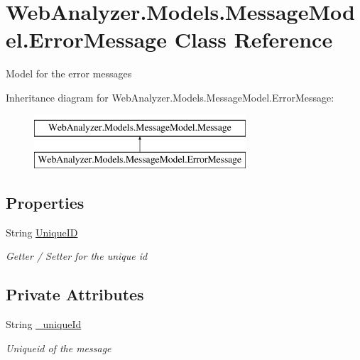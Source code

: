 \hypertarget{class_web_analyzer_1_1_models_1_1_message_model_1_1_error_message}{}\section{Web\+Analyzer.\+Models.\+Message\+Model.\+Error\+Message Class Reference}
\label{class_web_analyzer_1_1_models_1_1_message_model_1_1_error_message}


Model for the error messages  


Inheritance diagram for Web\+Analyzer.\+Models.\+Message\+Model.\+Error\+Message\+:\begin{figure}[H]
\begin{center}
\leavevmode
\includegraphics[height=2.000000cm]{class_web_analyzer_1_1_models_1_1_message_model_1_1_error_message}
\end{center}
\end{figure}
\subsection*{Properties}
\begin{DoxyCompactItemize}
\item 
String \hyperlink{class_web_analyzer_1_1_models_1_1_message_model_1_1_error_message_a795e90650dd234f29a110e27643828e2}{Unique\+I\+D}
\begin{DoxyCompactList}\small\item\em Getter / Setter for the unique id \end{DoxyCompactList}\end{DoxyCompactItemize}
\subsection*{Private Attributes}
\begin{DoxyCompactItemize}
\item 
String \hyperlink{class_web_analyzer_1_1_models_1_1_message_model_1_1_error_message_a06154fcc80f03446f4ed2a4e82ac6bd3}{\+\_\+unique\+Id}
\begin{DoxyCompactList}\small\item\em Uniqueid of the message \end{DoxyCompactList}\end{DoxyCompactItemize}
